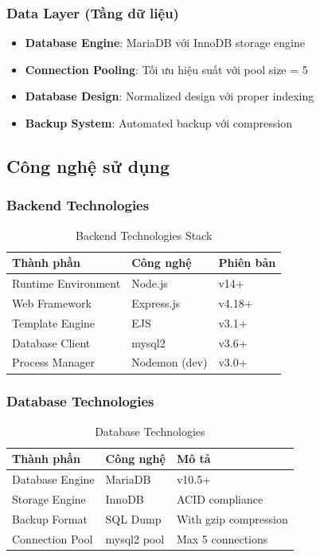 \documentclass[12pt,a4paper]{article}
\begin{document}
\subsubsection{Data Layer (Tầng dữ liệu)}
\begin{itemize}
    \item \textbf{Database Engine}: MariaDB với InnoDB storage engine
    \item \textbf{Connection Pooling}: Tối ưu hiệu suất với pool size = 5
    \item \textbf{Database Design}: Normalized design với proper indexing
    \item \textbf{Backup System}: Automated backup với compression
\end{itemize}

\subsection{Công nghệ sử dụng}
\subsubsection{Backend Technologies}
\begin{table}[H]
\centering
\begin{tabular}{@{}lll@{}}
\toprule
\textbf{Thành phần} & \textbf{Công nghệ} & \textbf{Phiên bản} \\
\midrule
Runtime Environment & Node.js & v14+ \\
Web Framework & Express.js & v4.18+ \\
Template Engine & EJS & v3.1+ \\
Database Client & mysql2 & v3.6+ \\
Process Manager & Nodemon (dev) & v3.0+ \\
\bottomrule
\end{tabular}
\caption{Backend Technologies Stack}
\end{table}

\subsubsection{Database Technologies}
\begin{table}[H]
\centering
\begin{tabular}{@{}lll@{}}
\toprule
\textbf{Thành phần} & \textbf{Công nghệ} & \textbf{Mô tả} \\
\midrule
Database Engine & MariaDB & v10.5+ \\
Storage Engine & InnoDB & ACID compliance \\
Backup Format & SQL Dump & With gzip compression \\
Connection Pool & mysql2 pool & Max 5 connections \\
\bottomrule
\end{tabular}
\caption{Database Technologies}
\end{table}
\end{document}
